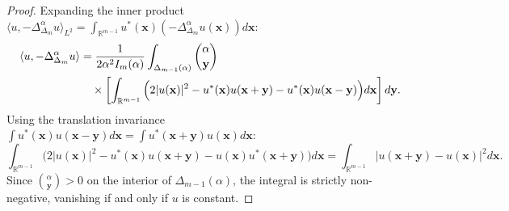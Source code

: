 \documentclass[11pt,a4paper]{article}
\theoremstyle{plain}
\theoremstyle{definition}
\theoremstyle{remark}
\numberwithin{equation}{section}
\begin{document}
\begin{proof}
Expanding the inner product $\langle u, -\Delta_{\Delta_m}^\alpha u \rangle_{L^2} = \int_{\mathbb{R}^{m-1}} u^*(\mathbf{x}) (-\Delta_{\Delta_m}^\alpha u(\mathbf{x})) d\mathbf{x}$:
\begin{align*}
\langle u, -\Delta_{\Delta_m}^\alpha u \rangle &= \frac{1}{2\alpha^2 I_m(\alpha)}\int_{\Delta_{m-1}(\alpha)} \binom{\alpha}{\mathbf{y}} \notag \\
&\quad \times \left[ \int_{\mathbb{R}^{m-1}} \Big(2|u(\mathbf{x})|^2 - u^*(\mathbf{x})u(\mathbf{x}+\mathbf{y}) - u^*(\mathbf{x})u(\mathbf{x}-\mathbf{y})\Big) d\mathbf{x} \right] d\mathbf{y}.
\end{align*}
Using the translation invariance $\int u^*(\mathbf{x})u(\mathbf{x}-\mathbf{y})d\mathbf{x} = \int u^*(\mathbf{x}+\mathbf{y})u(\mathbf{x})d\mathbf{x}$:
\begin{equation}
\int_{\mathbb{R}^{m-1}} \Big(2|u(\mathbf{x})|^2 - u^*(\mathbf{x})u(\mathbf{x}+\mathbf{y}) - u(\mathbf{x})u^*(\mathbf{x}+\mathbf{y})\Big) d\mathbf{x} = \int_{\mathbb{R}^{m-1}} |u(\mathbf{x}+\mathbf{y}) - u(\mathbf{x})|^2 d\mathbf{x}.
\end{equation}
Since $\binom{\alpha}{\mathbf{y}} > 0$ on the interior of $\Delta_{m-1}(\alpha)$, the integral is strictly non-negative, vanishing if and only if $u$ is constant.
\end{proof}
\end{document}
